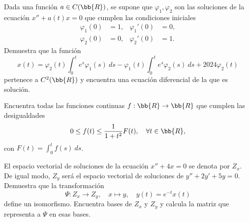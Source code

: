 \documentclass[12pt]{article}
\begin{document}
    \begin{ejercicio}
        Dada una función $a \in C(\bb{R})$, se supone que $\varphi_1, \varphi_2$ son las soluciones de la ecuación $x'' + a(t)x = 0$ que cumplen las condiciones iniciales
        \begin{align*}
            \varphi_1(0) &= 1, & \varphi_1'(0) &= 0,\\
            \varphi_2(0) &= 0, & \varphi_2'(0) &= 1.
        \end{align*}
        Demuestra que la función
        \begin{equation*}
            x(t) = \varphi_2(t) \int_0^t e^{s}\varphi_1(s)~ds - \varphi_1(t) \int_0^t e^{s}\varphi_2(s)~ds + 2024\varphi_2(t)
        \end{equation*}
        pertenece a $C^2(\bb{R})$ y encuentra una ecuación diferencial de la que es solución.
    \end{ejercicio}

    \begin{ejercicio}
        Encuentra todas las funciones continuas $f: \bb{R} \to \bb{R}$ que cumplen las desigualdades
        \begin{equation*}
            0 \leq f(t) \leq \dfrac{1}{1 + t^2}F(t), \quad \forall t \in \bb{R},
        \end{equation*}
        con $F(t) = \int_0^t f(s)~ds$.
    \end{ejercicio}

    \begin{ejercicio}
        El espacio vectorial de soluciones de la ecuación $x'' + 4x = 0$ se denota por $Z_x$. De igual modo, $Z_y$ será el espacio vectorial de soluciones de $y'' + 2y' + 5y = 0$. Demuestra que la transformación
        \begin{equation*}
            \Psi: Z_x \to Z_y, \quad x \mapsto y, \quad y(t) = e^{-t}x(t)
        \end{equation*}
        define un isomorfismo. Encuentra bases de $Z_x$ y $Z_y$ y calcula la matriz que representa a $\Psi$ en esas bases.
    \end{ejercicio}
\end{document}
